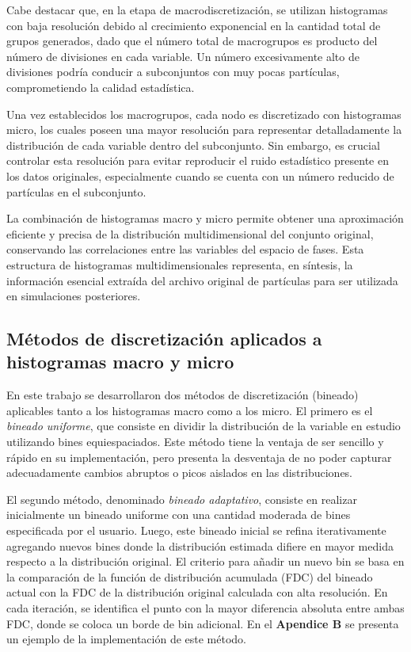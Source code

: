 Cabe destacar que, en la etapa de macrodiscretización, se utilizan histogramas con baja resolución debido al crecimiento exponencial en la cantidad total de grupos generados, dado que el número total de macrogrupos es producto del número de divisiones en cada variable. Un número excesivamente alto de divisiones podría conducir a subconjuntos con muy pocas partículas, comprometiendo la calidad estadística.

Una vez establecidos los macrogrupos, cada nodo es discretizado con histogramas micro, los cuales poseen una mayor resolución para representar detalladamente la distribución de cada variable dentro del subconjunto. Sin embargo, es crucial controlar esta resolución para evitar reproducir el ruido estadístico presente en los datos originales, especialmente cuando se cuenta con un número reducido de partículas en el subconjunto.

La combinación de histogramas macro y micro permite obtener una aproximación eficiente y precisa de la distribución multidimensional del conjunto original, conservando las correlaciones entre las variables del espacio de fases. Esta estructura de histogramas multidimensionales representa, en síntesis, la información esencial extraída del archivo original de partículas para ser utilizada en simulaciones posteriores.

\subsection{Métodos de discretización aplicados a histogramas macro y micro}
En este trabajo se desarrollaron dos métodos de discretización (bineado) aplicables tanto a los histogramas macro como a los micro. El primero es el \textit{bineado uniforme}, que consiste en dividir la distribución de la variable en estudio utilizando bines equiespaciados. Este método tiene la ventaja de ser sencillo y rápido en su implementación, pero presenta la desventaja de no poder capturar adecuadamente cambios abruptos o picos aislados en las distribuciones.

El segundo método, denominado \textit{bineado adaptativo}, consiste en realizar inicialmente un bineado uniforme con una cantidad moderada de bines especificada por el usuario. Luego, este bineado inicial se refina iterativamente agregando nuevos bines donde la distribución estimada difiere en mayor medida respecto a la distribución original. El criterio para añadir un nuevo bin se basa en la comparación de la función de distribución acumulada (FDC) del bineado actual con la FDC de la distribución original calculada con alta resolución. En cada iteración, se identifica el punto con la mayor diferencia absoluta entre ambas FDC, donde se coloca un borde de bin adicional. En el \textbf{Apendice B} se presenta un ejemplo de la implementación de este método.

